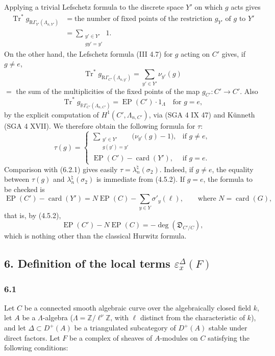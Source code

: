 \documentclass[11pt]{article}
\providecommand{\Tr}{\operatorname{Tr}}
\providecommand{\EP}{\operatorname{EP}}
\providecommand{\Tr}{\operatorname{Tr}}
\providecommand{\Tr}{\operatorname{Tr}}
\providecommand{\Tr}{\operatorname{Tr}}
\providecommand{\EP}{\operatorname{EP}}
\providecommand{\RG}{\mathrm R\Gamma}
\providecommand{\Tr}{\operatorname{Tr}}
\begin{document}
Applying a trivial Lefschetz formula to the discrete space $Y'$ on which $g$ acts gives
\[
\begin{aligned}
\Tr^*g_{\RG_{Y'}(\Lambda_{n,Y'})}
&=\text{the number of fixed points of the restriction $g_{Y'}$ of $g$ to $Y'$}\\
&=\sum_{\substack{y'\in Y'\\gy'=y'}}1.
\end{aligned}
\]
On the other hand, the Lefschetz formula (III 4.7) for $g$ acting on $C'$ gives, if $g\ne e$,
\[
\Tr^*g_{\RG_{C'}(\Lambda_{n,y'})}
=
\sum_{y'\in Y'} \nu_{y'}(g)
\]
$=$ the sum of the multiplicities of the fixed points of the map $g_{C'}:C'\to C'$. Also
\[
\Tr^*g_{\mathbb{R}\Gamma_{C'}(\Lambda_{n,C'})}=\EP(C')\cdot1_\Lambda
\quad\text{for }g=e,
\]
by the explicit computation of $H^1(C',\Lambda_{n,C'})$, via (SGA 4 IX 47) and Künneth (SGA 4 XVII). We therefore obtain the following formula for $\tau$:
\[
\tau(g)=
\begin{cases}
\displaystyle\sum_{\substack{y'\in Y'\\g(y')=y'}}\bigl(\nu_{y'}(g)-1\bigr),& \text{if } g\ne e,\\[0.8em]
\EP(C')-\operatorname{card}(Y'),& \text{if } g=e.
\end{cases}
\tag{5.2.2}
\]
Comparison with (6.2.1) gives easily $\tau=\lambda_n^\natural(\sigma_2)$. Indeed, if $g\ne e$, the equality between $\tau(g)$ and $\lambda_n^\natural(\sigma_2)$ is immediate from (4.5.2). If $g=e$, the formula to be checked is
\[
\EP(C')-\operatorname{card}(Y')
=
N\EP(C)-\sum_{y\in Y}\sigma'_y(\ell),
\qquad\text{where } N=\operatorname{card}(G),
\]
that is, by (4.5.2),
\[
\EP(C')-N\EP(C)=-\deg(\mathfrak D_{C'/C}),
\]
which is nothing other than the classical Hurwitz formula.

\subsection*{6. Definition of the local terms $\varepsilon_x^\Delta(F)$}

\subsubsection*{6.1}

Let $C$ be a connected smooth algebraic curve over the algebraically closed field $k$, let $A$ be a $\Lambda$-algebra ($\Lambda=\mathbb Z/\ell^\nu\mathbb Z$, with $\ell$ distinct from the characteristic of $k$), and let $\Delta\subset D^+(A)$ be a triangulated subcategory of $D^+(A)$ stable under direct factors. Let $F$ be a complex of sheaves of $A$-modules on $C$ satisfying the following conditions:
\end{document}
